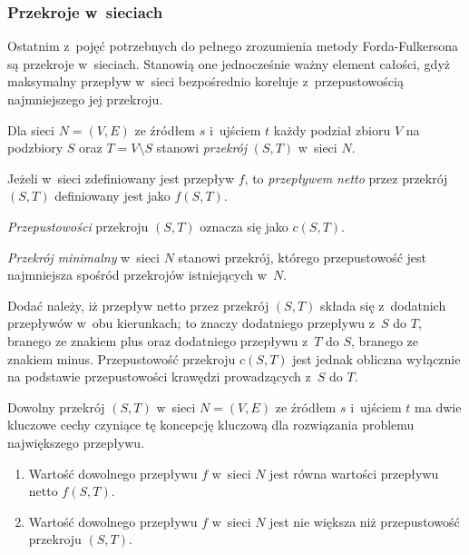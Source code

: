 \subsubsection{\textbf{Przekroje w~sieciach}}
\par{
  Ostatnim z~pojęć potrzebnych do pełnego zrozumienia metody Forda-Fulkersona są przekroje w~sieciach.
  Stanowią one jednocześnie ważny element całości, gdyż maksymalny przepływ w~sieci bezpośrednio koreluje z~przepustowością najmniejszego jej przekroju.
  \begin{definition}
    Dla sieci $N=(V, E)$ ze źródłem $s$ i~ujściem $t$ każdy podział zbioru $V$ na podzbiory $S$ oraz $T=V\setminus S$ stanowi \emph{przekrój} $(S,T)$ w~sieci $N$.

    Jeżeli w~sieci zdefiniowany jest przepływ $f$, to \emph{przepływem netto} przez przekrój $(S, T)$ definiowany jest jako $f(S, T)$.

    \emph{Przepustowości} przekroju $(S, T)$ oznacza się jako $c(S, T)$.

    \emph{Przekrój minimalny} w~sieci $N$ stanowi przekrój, którego przepustowość jest najmniejsza spośród przekrojów istniejących w~$N$.
  \end{definition}
}
\par{
  Dodać należy, iż przepływ netto przez przekrój $(S, T)$ składa się z~dodatnich przepływów w~obu kierunkach; to znaczy dodatniego przepływu z~$S$ do $T$, branego ze znakiem plus oraz dodatniego przepływu z~$T$ do $S$, branego ze znakiem minus.
  Przepustowość przekroju $c(S, T)$ jest jednak obliczna wyłącznie na podstawie przepustowości krawędzi prowadzących z~$S$ do $T$.
}
\par{
  Dowolny przekrój $(S, T)$ w~sieci $N=(V, E)$ ze źródłem $s$ i~ujściem $t$ ma dwie kluczowe cechy czyniące tę koncepcję kluczową dla rozwiązania problemu największego przepływu.
  \begin{enumerate}
    \item Wartość dowolnego przepływu $f$ w~sieci $N$ jest równa wartości przepływu netto $f(S,T)$.
    \item Wartość dowolnego przepływu $f$ w~sieci $N$ jest nie większa niż przepustowość przekroju $(S, T)$.
  \end{enumerate}
}
